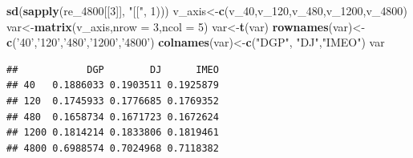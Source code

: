 \documentclass[
]{article}
\newenvironment{Shaded}{\begin{snugshade}}{\end{snugshade}}
\newcommand{\DataTypeTok}[1]{\textcolor[rgb]{0.13,0.29,0.53}{#1}}
\newcommand{\DecValTok}[1]{\textcolor[rgb]{0.00,0.00,0.81}{#1}}
\newcommand{\KeywordTok}[1]{\textcolor[rgb]{0.13,0.29,0.53}{\textbf{#1}}}
\newcommand{\NormalTok}[1]{#1}
\newcommand{\StringTok}[1]{\textcolor[rgb]{0.31,0.60,0.02}{#1}}
\begin{document}
\begin{Shaded}
\begin{Highlighting}[]
        \KeywordTok{sd}\NormalTok{(}\KeywordTok{sapply}\NormalTok{(re_}\DecValTok{4800}\NormalTok{[[}\DecValTok{3}\NormalTok{]], }\StringTok{"[["}\NormalTok{, }\DecValTok{1}\NormalTok{)))}
\NormalTok{v_axis<-}\KeywordTok{c}\NormalTok{(v_}\DecValTok{40}\NormalTok{,v_}\DecValTok{120}\NormalTok{,v_}\DecValTok{480}\NormalTok{,v_}\DecValTok{1200}\NormalTok{,v_}\DecValTok{4800}\NormalTok{)}
\NormalTok{var<-}\KeywordTok{matrix}\NormalTok{(v_axis,}\DataTypeTok{nrow =} \DecValTok{3}\NormalTok{,}\DataTypeTok{ncol =} \DecValTok{5}\NormalTok{)}
\NormalTok{var<-}\KeywordTok{t}\NormalTok{(var)}
\KeywordTok{rownames}\NormalTok{(var)<-}\KeywordTok{c}\NormalTok{(}\StringTok{'40'}\NormalTok{,}\StringTok{'120'}\NormalTok{,}\StringTok{'480'}\NormalTok{,}\StringTok{'1200'}\NormalTok{,}\StringTok{'4800'}\NormalTok{)}
\KeywordTok{colnames}\NormalTok{(var)<-}\KeywordTok{c}\NormalTok{(}\StringTok{"DGP"}\NormalTok{, }\StringTok{"DJ"}\NormalTok{,}\StringTok{"IMEO"}\NormalTok{)}
\NormalTok{var}
\end{Highlighting}
\end{Shaded}

\begin{verbatim}
##            DGP        DJ      IMEO
## 40   0.1886033 0.1903511 0.1925879
## 120  0.1745933 0.1776685 0.1769352
## 480  0.1658734 0.1671723 0.1672624
## 1200 0.1814214 0.1833806 0.1819461
## 4800 0.6988574 0.7024968 0.7118382
\end{verbatim}
\end{document}
